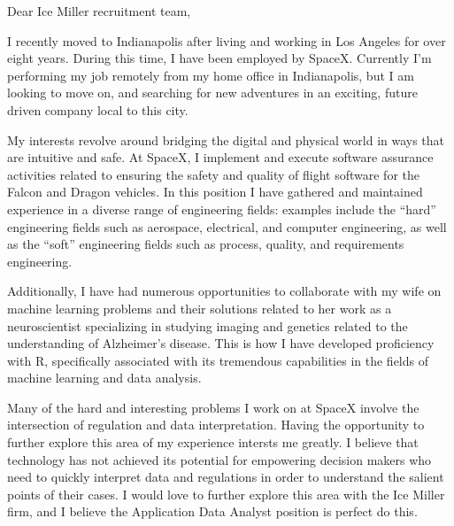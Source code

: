 \begin{cvletter}


Dear Ice Miller recruitment team,

I recently moved to Indianapolis after living and working in Los Angeles for
over eight years. During this time, I have been employed by SpaceX. Currently
I'm performing my job remotely from my home office in Indianapolis, but I am
looking to move on, and searching for new adventures in an exciting, future
driven company local to this city.

My interests revolve around bridging the digital and physical world in ways that
are intuitive and safe. At SpaceX, I implement and execute software assurance
activities related to ensuring the safety and quality of flight software for the
Falcon and Dragon vehicles. In this position I have gathered and maintained
experience in a diverse range of engineering fields: examples include the
``hard'' engineering fields such as aerospace, electrical, and computer
engineering, as well as the ``soft'' engineering fields such as process,
quality, and requirements engineering.

Additionally, I have had numerous opportunities to collaborate with my wife on
machine learning problems and their solutions related to her work as a
neuroscientist specializing in studying imaging and genetics related to the
understanding of Alzheimer's disease. This is how I have developed proficiency
with R, specifically associated with its tremendous capabilities in the fields
of machine learning and data analysis.




Many of the hard and interesting problems I work on at SpaceX involve the
intersection of regulation and data interpretation. Having the opportunity to
further explore this area of my experience intersts me greatly. I believe that
technology has not achieved its potential for empowering decision makers who
need to quickly interpret data and regulations in order to understand the
salient points of their cases. I would love to further explore this area with
the Ice Miller firm, and I believe the Application Data Analyst position is
perfect do this.



\end{cvletter}
